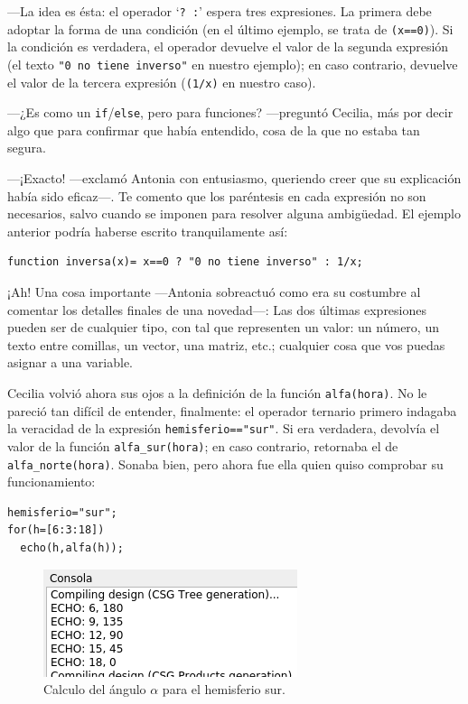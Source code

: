 ---La idea es ésta: el operador `\lstinline!? :!' espera tres
expresiones. La primera debe adoptar la forma de una condición (en el
último ejemplo, se trata de \lstinline!(x==0)!). Si la condición es
verdadera, el operador devuelve el valor de la segunda expresión (el
texto \lstinline!"0 no tiene inverso"! en nuestro ejemplo); en caso
contrario, devuelve el valor de la tercera expresión
(\lstinline!(1/x)! en nuestro caso).

---¿Es como un \lstinline!if!/\lstinline!else!, pero para funciones?
---pre\-gun\-tó Cecilia, más por decir algo que para confirmar que había
entendido, cosa de la que no estaba tan segura.

---¡Exacto! ---exclamó Antonia con entusiasmo, queriendo creer que su
explicación había sido eficaz---. Te comento que los paréntesis en
cada expresión no son necesarios, salvo cuando se imponen para
resolver alguna ambigüedad. El ejemplo anterior podría haberse escrito
tranquilamente así:

\begin{lstlisting}[numbers=none]
function inversa(x)= x==0 ? "0 no tiene inverso" : 1/x;
\end{lstlisting}

\guillemotright ¡Ah! Una cosa importante ---Antonia sobreactuó como
era su costumbre al comentar los detalles finales de una novedad---:
Las dos últimas expresiones pueden ser de cualquier tipo, con tal que
representen un valor: un número, un texto entre comillas, un vector,
una matriz, etc.; cualquier cosa que vos puedas asignar a una
variable.

Cecilia volvió ahora sus ojos a la definición de la función
\lstinline!alfa(hora)!. No le pareció tan difícil de entender,
finalmente: el operador ternario primero indagaba la veracidad de la
expresión \lstinline!hemisferio=="sur"!. Si era verdadera, devolvía el
valor de la función \lstinline!alfa_sur(hora)!; en caso contrario,
retornaba el de \lstinline!alfa_norte(hora)!. Sonaba bien, pero ahora
fue ella quien quiso comprobar su funcionamiento:

\begin{lstlisting}
hemisferio="sur";
for(h=[6:3:18])
  echo(h,alfa(h));
\end{lstlisting}

\begin{figure}[ht]
  \centering
  \includegraphics[width=.55\textwidth]{imagenes/consola-echo-alfa-sur}
  \caption[$alpha$ para el hemisferio sur.]{Calculo del ángulo
    $\alpha$ para el hemisferio sur.}
  \label{fig:consola-echo-alfa-sur}
\end{figure}

